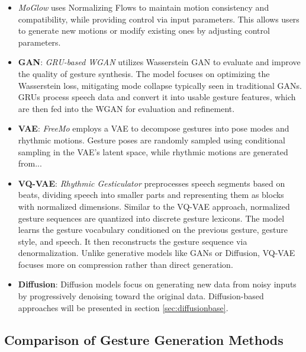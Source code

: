 \begin{itemize}
	\item \textit{MoGlow} \cite{henter2020moglow} uses Normalizing Flows to maintain motion consistency and compatibility, while providing control via input parameters. This allows users to generate new motions or modify existing ones by adjusting control parameters.

	\item \textbf{GAN}: \textit{GRU-based WGAN} \cite{wu2021probabilistic} utilizes Wasserstein GAN to evaluate and improve the quality of gesture synthesis. The model focuses on optimizing the Wasserstein loss, mitigating mode collapse typically seen in traditional GANs. GRUs process speech data and convert it into usable gesture features, which are then fed into the WGAN for evaluation and refinement.

	\item \textbf{VAE}: \textit{FreeMo} \cite{xu2022freeform} employs a VAE to decompose gestures into pose modes and rhythmic motions. Gesture poses are randomly sampled using conditional sampling in the VAE's latent space, while rhythmic motions are generated from...

	\item \textbf{VQ-VAE}: \textit{Rhythmic Gesticulator} \cite{ao2022rhythmic} preprocesses speech segments based on beats, dividing speech into smaller parts and representing them as blocks with normalized dimensions. Similar to the VQ-VAE approach, normalized gesture sequences are quantized into discrete gesture lexicons. The model learns the gesture vocabulary conditioned on the previous gesture, gesture style, and speech. It then reconstructs the gesture sequence via denormalization. Unlike generative models like GANs or Diffusion, VQ-VAE focuses more on compression rather than direct generation.

	\item \textbf{Diffusion}: Diffusion models focus on generating new data from noisy inputs by progressively denoising toward the original data. Diffusion-based approaches will be presented in section \autoref{sec:diffusionbase}.
\end{itemize}

\subsection{Comparison of Gesture Generation Methods}

